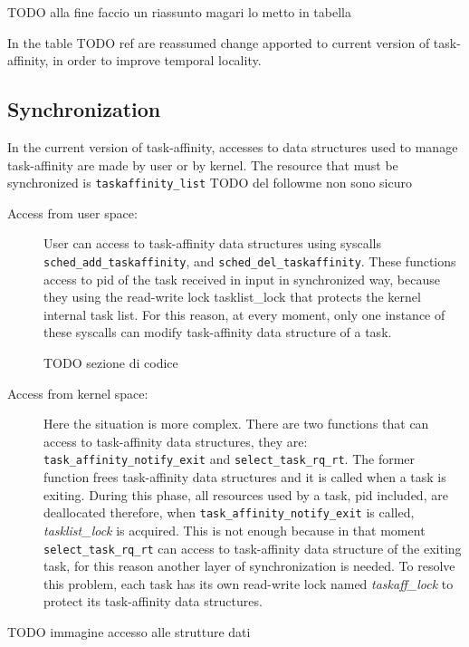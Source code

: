 TODO alla fine faccio un riassunto magari lo metto in tabella

In the table TODO ref are reassumed change apported to current version of task-affinity, in order to improve temporal locality.

\subsection{Synchronization}


In the current version of task-affinity, accesses to data structures used to manage task-affinity are made by user or by kernel. The resource that must be
synchronized is \texttt{taskaffinity\_list} TODO del followme non sono sicuro

\begin{description}

\item[Access from user space:] User can access to task-affinity data structures using syscalls \texttt{sched\_add\_taskaffinity}, and 
\texttt{sched\_del\_taskaffinity}. These functions access to pid of the task received in input in synchronized way, because they using the read-write lock
tasklist\_lock that protects the kernel internal task list. For this reason, at every moment, only one instance of these syscalls can modify task-affinity 
data structure of a task.

TODO sezione di codice

\item[Access from kernel space:] Here the situation is more complex. There are two functions that can access to task-affinity data structures, they are:
\texttt{task\_affinity\_notify\_exit} and \texttt{select\_task\_rq\_rt}. The former function frees task-affinity data structures and it is called when a 
task is exiting. During this phase, all resources used by a task, pid included, are deallocated therefore, when \texttt{task\_affinity\_notify\_exit} is 
called, \textit{tasklist\_lock} is acquired. This is not enough because in that moment \texttt{select\_task\_rq\_rt} can access to task-affinity data 
structure of the exiting task, for this reason another layer of synchronization is needed. To resolve this problem, each task has its own read-write lock 
named \textit{taskaff\_lock} to protect its task-affinity data structures. 

\end{description}

TODO immagine accesso alle strutture dati

